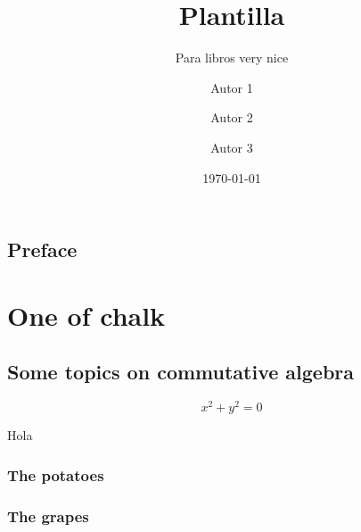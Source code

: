 \documentclass[draft]{qx-files/qx-book}
\title{Plantilla}
\author{Autor 1 \and Autor 2 \and Autor 3}
\date{\today}
\subtitle{Para libros very nice}
\begin{document}
\MakeBookCover

\frontmatter


\maketitle





\chapter{Preface}

\lipsum[1]




\tableofcontents

\mainmatter

\part{One of chalk}


\chapter[Álgebra conmutativa]{Some topics on commutative algebra}
\lipsum[2]
\begin{equation}
  x^2 + y^2 = 0
\end{equation}



\lipsum[1]


\lipsum[1]

\begin{theorem}
  Hola
\end{theorem}



\lipsum[1]



\section{The potatoes}

\lipsum[1-2]



\lipsum[1]

\ExerciseSection

\section{The grapes}

\lipsum[1]
\end{document}
